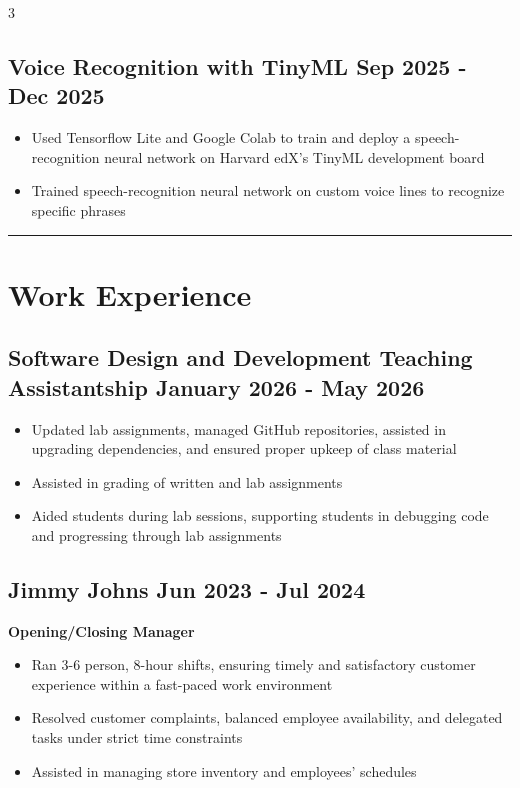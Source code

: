 \documentclass{article}
\newcommand{\makedivider}[1]{\textcolor{black!20}{\rule{\textwidth}{#1}}}%
\newcommand{\dateto}[1]{
\normalsize
\textnormal{\hfill#1}}%
\begin{document}
\begin{paracol}{3}
\begin{tcolorbox}[colback=white, left=0.5in, right =0.5in, top=0.1in, breakable, colframe=white]
    \subsection*{{Voice Recognition with TinyML}\dateto{Sep 2025 - Dec 2025}}
    \begin{itemize}
        \item Used Tensorflow Lite and Google Colab to train and deploy a speech-recognition neural network on Harvard edX's TinyML development board 
        \item Trained speech-recognition neural network on custom voice lines to recognize specific phrases
    \end{itemize}

    \vspace{0.25in}
    \makedivider{0.05in}
    
    \section*{Work Experience}
    \subsection*{Software Design and Development Teaching Assistantship\dateto{January 2026 - May 2026}}
    \begin{itemize}
        \item Updated lab assignments, managed GitHub repositories, assisted in upgrading dependencies, and ensured proper upkeep of class material
        \item Assisted in grading of written and lab assignments
        \item Aided students during lab sessions, supporting students in debugging code and progressing through lab assignments
    \end{itemize}
    \subsection*{Jimmy Johns {}\dateto{Jun 2023 - Jul 2024}}
    \textbf{Opening/Closing Manager}
    \begin{itemize}
        \item Ran 3-6 person, 8-hour shifts, ensuring timely and satisfactory customer experience within a fast-paced work environment
        \item Resolved customer complaints, balanced employee availability, and delegated tasks under strict time constraints
        \item Assisted in managing store inventory and employees' schedules
    \end{itemize}

\end{tcolorbox}
\end{paracol}
\end{document}
